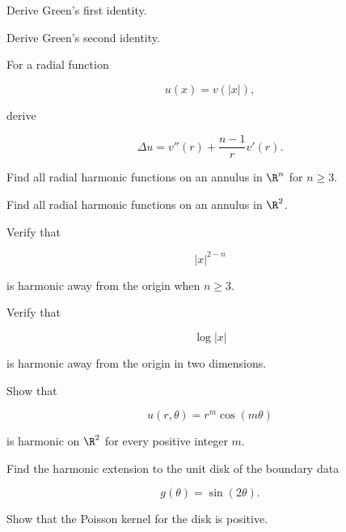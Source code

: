 \begin{exercise}[2]
Derive Green's first identity.
\end{exercise}

\begin{exercise}[2]
Derive Green's second identity.
\end{exercise}

\begin{exercise}[2]
For a radial function

\[
u(x)=v(|x|),
\]

derive

\[
\Delta u
=
v''(r)
+
\frac{n-1}{r}v'(r).
\]
\end{exercise}

\begin{exercise}[2]
Find all radial harmonic functions on an annulus in \(\R^n\) for
\(n\geq3\).
\end{exercise}

\begin{exercise}[2]
Find all radial harmonic functions on an annulus in \(\R^2\).
\end{exercise}

\begin{exercise}[2]
Verify that

\[
|x|^{2-n}
\]

is harmonic away from the origin when \(n\geq3\).
\end{exercise}

\begin{exercise}[2]
Verify that

\[
\log|x|
\]

is harmonic away from the origin in two dimensions.
\end{exercise}

\begin{exercise}[2]
Show that

\[
u(r,\theta)=r^m\cos(m\theta)
\]

is harmonic on \(\R^2\) for every positive integer \(m\).
\end{exercise}

\begin{exercise}[2]
Find the harmonic extension to the unit disk of the boundary data

\[
g(\theta)=\sin(2\theta).
\]
\end{exercise}

\begin{exercise}[2]
Show that the Poisson kernel for the disk is positive.
\end{exercise}

